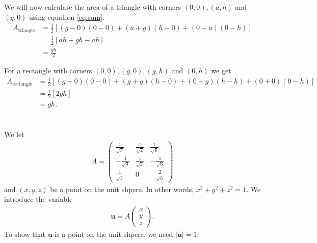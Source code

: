 \documentclass[a4paper,10pt,english]{article}
\begin{document}
\subsection{} \label{1d}
We will now calculate the area of a triangle with corners $(0, 0), (a, h)$ and $(g, 0)$ using equation \ref{eq:sum}.
\begin{align*}
    A_{\text{triangle}} &= \frac{1}{2} [(g-0)(0-0) + (a+g)(h-0) + (0+a)(0-h)] \\
    &= \frac{1}{2} [ah + gh - ah] \\
    &= \frac{gh}{2}
\end{align*}

For a rectangle with corners $(0, 0), (g, 0), (g, h)$ and $(0, h)$ we get
\begin{align*}
    A_{\text{rectangle}} &= \frac{1}{2} [(g+0)(0-0) + (g+g)(h-0) + (0+g)(h-h) + (0+0)(0-h)] \\
    &= \frac{1}{2} [2gh] \\
    &= gh.
\end{align*}

\newpage

\section{} \label{2}

\subsection{} \label{2a}
We let 
\begin{align}
    A = 
    \begin{pmatrix}
        \frac{1}{\sqrt 3} & \frac{1}{\sqrt 2} & \frac{1}{\sqrt 6} \\
        - \frac{1}{\sqrt 3} & \frac{1}{\sqrt 2} & - \frac{1}{\sqrt 6} \\
        \frac{1}{\sqrt 3} & 0 & - \frac{2}{\sqrt 6}
    \end{pmatrix}
\end{align}
and $(x, y, z)$ be a point on the unit shpere. In other words, $x^2 + y^2 + z^2 = 1$. We introduce the variable
\begin{align*}
    \bm{u} = A 
    \begin{pmatrix}
        x\\ 
        y\\ 
        z
    \end{pmatrix}.
\end{align*}
To show that $\bm{u}$ is a point on the unit shpere, we need $|\bm{u}|=1$.
\end{document}
